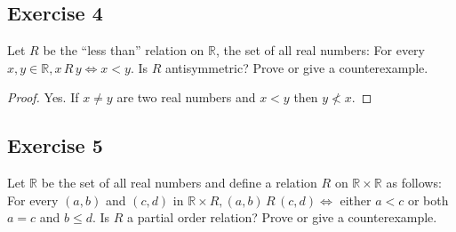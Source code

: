 \documentclass[14pt]{extarticle}
\newcommand{\R}{\mathbb{R}}
\begin{document}
\subsection{Exercise 4}
Let $R$ be the “less than” relation on $\R$, the set of all real numbers: For every \(x, y \in \R, x \,R\, y \iff x <
y\). Is $R$ antisymmetric? Prove or give a counterexample.

\begin{proof}
        Yes. If \(x \neq y\) are two real numbers and \(x < y\) then \(y \nless x\).
\end{proof}

\subsection{Exercise 5}
Let $\R$ be the set of all real numbers and define a relation $R$ on \(\R \times \R\) as follows: For every
\((a, b)\) and \((c, d)\) in \(\R \times R, (a, b) \,R\, (c, d) \iff\) either \(a < c\) or both \(a = c\) and
\(b \leq d\). Is $R$ a partial order relation? Prove or give a counterexample.
\end{document}
